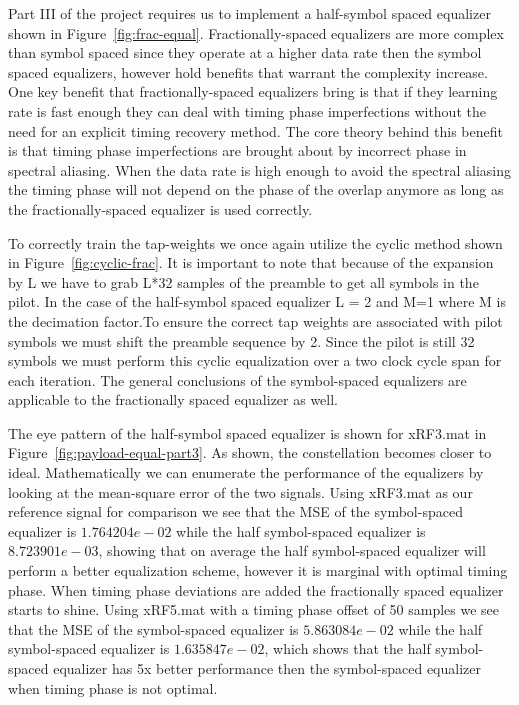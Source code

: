 Part III of the project requires us to implement a half-symbol spaced equalizer shown in Figure~\ref{fig:frac-equal}. Fractionally-spaced equalizers are more complex than symbol spaced since they operate at a higher data rate then the symbol spaced equalizers, however hold benefits that warrant the complexity increase. One key benefit that fractionally-spaced equalizers bring is that if they learning rate is fast enough they can deal with timing phase imperfections without the need for an explicit timing recovery method. The core theory behind this benefit is that timing phase imperfections are brought about by incorrect phase in spectral aliasing. When the data rate is high enough to avoid the spectral aliasing the timing phase will not depend on the phase of the overlap anymore as long as the fractionally-spaced equalizer is used correctly.

To correctly train the tap-weights we once again utilize the cyclic method shown in Figure~\ref{fig:cyclic-frac}. It is important to note that because of the expansion by L we have to grab L*32 samples of the preamble to get all symbols in the pilot. In the case of the half-symbol spaced equalizer L = 2 and M=1 where M is the decimation factor.To ensure the correct tap weights are associated with pilot symbols we must shift the preamble sequence by 2. Since the pilot is still 32 symbols we must perform this cyclic equalization over a two clock cycle span for each iteration. The general conclusions of the symbol-spaced equalizers are applicable to the fractionally spaced equalizer as well.

The eye pattern of the half-symbol spaced equalizer is shown for xRF3.mat in Figure~\ref{fig:payload-equal-part3}. As shown, the constellation becomes closer to ideal. Mathematically we can enumerate the performance of the equalizers by looking at the mean-square error of the two signals. Using xRF3.mat as our reference signal for comparison we see that the MSE of the symbol-spaced equalizer is $1.764204e-02$ while the half symbol-spaced equalizer is $8.723901e-03$, showing that on average the half symbol-spaced equalizer will perform a better equalization scheme, however it is marginal with optimal timing phase. When timing phase deviations are added the fractionally spaced equalizer starts to shine. Using xRF5.mat with a timing phase offset of 50 samples we see that the MSE of the symbol-spaced equalizer is $5.863084e-02$ while the half symbol-spaced equalizer is $1.635847e-02$, which shows that the half symbol-spaced equalizer has 5x better performance then the symbol-spaced equalizer when timing phase is not optimal.